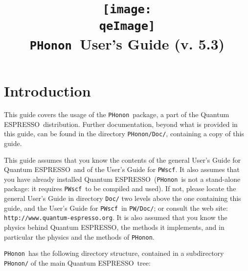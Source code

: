 \documentclass[12pt,a4paper]{article}
\def\version{5.3}
\def\qe{{\sc Quantum ESPRESSO}}
\def\PWscf{\texttt{PWscf}}
\def\PHonon{\texttt{PHonon}}
\begin{document}
 
\author{}
\date{}

\def\qeImage{../../Doc/quantum_espresso.pdf}

\title{
  \texttt{[image: \\qeImage]} \\
  \Huge \PHonon\ User's Guide (v. \version)
}

\maketitle

\tableofcontents

\section{Introduction}

This guide covers the usage of the \PHonon\ package, a
part of the \qe\ distribution. 
Further documentation, beyond what is provided 
in this guide, can be found in the directory
\texttt{PHonon/Doc/}, containing a copy of this guide.

This guide assumes that you know the contents of 
the general User's Guide for \qe\ and of the User's 
Guide for \PWscf. It also assumes that you have
already installed \qe\ (\PHonon\ is not a stand-alone
package: it requires \PWscf\ to be compiled and used).
If not, please locate the general User's Guide in directory 
\texttt{Doc/} two levels above the one containing this guide,
and the User's Guide for \PWscf\ in \texttt{PW/Doc/};
or consult the web site:\\
\texttt{http://www.quantum-espresso.org}.
It is also assumed that you know the physics behind \qe,
the methods it implements, and in particular the physics
and the methods of \PHonon.


\PHonon\ has the following directory structure,
contained in a subdirectory \texttt{PHonon/}
of the main \qe\ tree:
\end{document}
